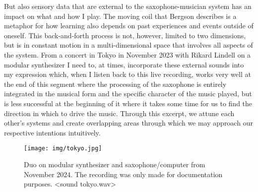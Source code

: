 \documentclass[11pt]{article}
\begin{document}
But also sensory data that are external to the saxophone-musician system has an impact on what and how I play.
The moving coil that Bergson describes is a metaphor for how learning also depends on past experiences and events outside of oneself.
This back-and-forth process is not, however, limited to two dimensions, but is in constant motion in a multi-dimensional space that involves all aspects of the system.
From a concert in Tokyo in November 2023 with  Rikard Lindell on a modular synthesizer I need to, at times, incorporate these external sounds into my  expression which, when I listen back to this live recording, works very well at the end of this segment where the processing of the saxophone is entirely integrated in the musical form and the specific character of the music played, but is less successful at the beginning of it where it takes some time for us to find the direction in which to drive the music.
Through this excerpt, we attune each other's systems and create overlapping areas through which we may approach our respective intentions intuitively.

\begin{figure}[htbp]
\centering
\texttt{[image: img/tokyo.jpg]}
\caption{\label{fig:org8abf1f2}Duo on modular synthesizer and saxophone/computer from November 2024. The recording was only made for documentation purposes. <sound tokyo.wav>}
\end{figure}
\end{document}
